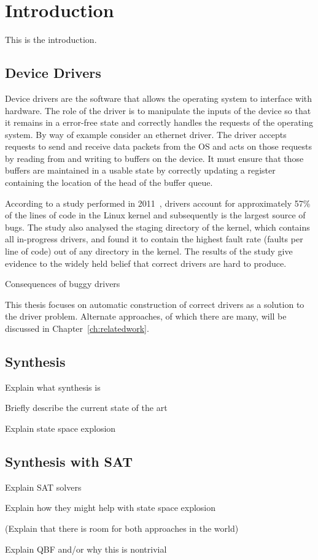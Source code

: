 \chapter{Introduction}

This is the introduction.

\section{Device Drivers}

Device drivers are the software that allows the operating system to interface
with hardware. The role of the driver is to manipulate the inputs of the device
so that it remains in a error-free state and correctly handles the requests of
the operating system. By way of example consider an ethernet driver. The driver
accepts requests to send and receive data packets from the OS and acts on those
requests by reading from and writing to buffers on the device. It must ensure
that those buffers are maintained in a usable state by correctly updating a
register containing the location of the head of the buffer queue.

According to a study performed in 2011~\cite{Palix11}, drivers account for
approximately 57\% of the lines of code in the Linux kernel and subsequently is
the largest source of bugs. The study also analysed the staging directory of
the kernel, which contains all in-progress drivers, and found it to contain the
highest fault rate (faults per line of code) out of any directory in the
kernel. The results of the study give evidence to the widely held belief that
correct drivers are hard to produce.

Consequences of buggy drivers

This thesis focuses on automatic construction of correct drivers as a solution
to the driver problem. Alternate approaches, of which there are many, will be
discussed in Chapter~\ref{ch:relatedwork}.

\section{Synthesis}

Explain what synthesis is

Briefly describe the current state of the art

Explain state space explosion

\section{Synthesis with SAT}

Explain SAT solvers

Explain how they might help with state space explosion

(Explain that there is room for both approaches in the world)

Explain QBF and/or why this is nontrivial
